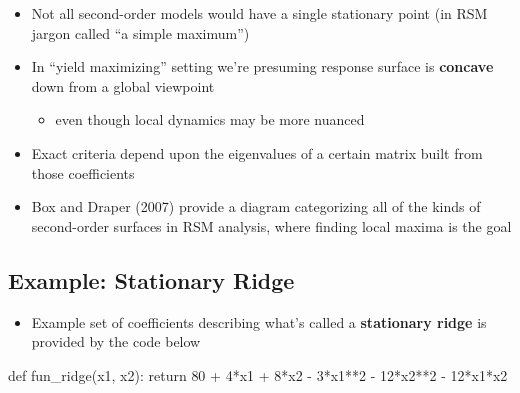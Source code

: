 \documentclass[
  letterpaper,
  DIV=11,
  numbers=noendperiod]{scrreprt}
\newenvironment{Shaded}{\begin{snugshade}}{\end{snugshade}}
\newcommand{\ControlFlowTok}[1]{\textcolor[rgb]{0.00,0.23,0.31}{#1}}
\newcommand{\DecValTok}[1]{\textcolor[rgb]{0.68,0.00,0.00}{#1}}
\newcommand{\KeywordTok}[1]{\textcolor[rgb]{0.00,0.23,0.31}{#1}}
\newcommand{\NormalTok}[1]{\textcolor[rgb]{0.00,0.23,0.31}{#1}}
\newcommand{\OperatorTok}[1]{\textcolor[rgb]{0.37,0.37,0.37}{#1}}
\providecommand{\tightlist}{%
  \setlength{\itemsep}{0pt}\setlength{\parskip}{0pt}}\usepackage{longtable,booktabs,array}
\begin{document}
\begin{itemize}
\tightlist
\item
  Not all second-order models would have a single stationary point (in
  RSM jargon called ``a simple maximum'')
\item
  In ``yield maximizing'' setting we're presuming response surface is
  \textbf{concave} down from a global viewpoint

  \begin{itemize}
  \tightlist
  \item
    even though local dynamics may be more nuanced
  \end{itemize}
\item
  Exact criteria depend upon the eigenvalues of a certain matrix built
  from those coefficients
\item
  Box and Draper (2007) provide a diagram categorizing all of the kinds
  of second-order surfaces in RSM analysis, where finding local maxima
  is the goal
\end{itemize}

\subsection{Example: Stationary Ridge}\label{example-stationary-ridge}

\begin{itemize}
\tightlist
\item
  Example set of coefficients describing what's called a
  \textbf{stationary ridge} is provided by the code below
\end{itemize}

\begin{Shaded}
\begin{Highlighting}[]
\KeywordTok{def}\NormalTok{ fun\_ridge(x1, x2):}
    \ControlFlowTok{return} \DecValTok{80} \OperatorTok{+} \DecValTok{4}\OperatorTok{*}\NormalTok{x1 }\OperatorTok{+} \DecValTok{8}\OperatorTok{*}\NormalTok{x2 }\OperatorTok{{-}} \DecValTok{3}\OperatorTok{*}\NormalTok{x1}\OperatorTok{**}\DecValTok{2} \OperatorTok{{-}} \DecValTok{12}\OperatorTok{*}\NormalTok{x2}\OperatorTok{**}\DecValTok{2} \OperatorTok{{-}} \DecValTok{12}\OperatorTok{*}\NormalTok{x1}\OperatorTok{*}\NormalTok{x2}
\end{Highlighting}
\end{Shaded}
\end{document}
